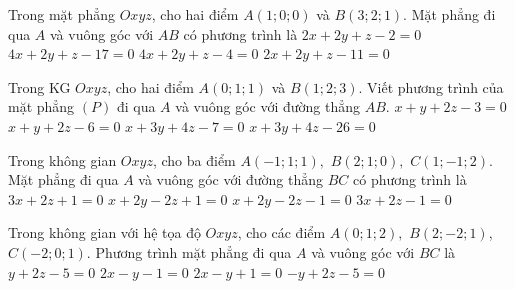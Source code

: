 \begin{ex}%
	Trong mặt phẳng $O x y z$, cho hai điểm $A(1 ; 0 ; 0)$ và $B(3 ; 2 ; 1)$. Mặt phẳng đi qua $A$ và vuông góc với $A B$ có phương trình là
	\choice
	{\True $2 x+2 y+z-2=0$}
	{$4 x+2 y+z-17=0$}
	{$4 x+2 y+z-4=0$}
	{$2 x+2 y+z-11=0$}
\end{ex}
\begin{ex}%
	Trong KG $Oxyz$, cho hai điểm $A(0 ; 1 ; 1)$  và $B(1 ; 2 ; 3)$. Viết phương trình của mặt phẳng $(P)$ đi qua $A$ và vuông góc với đường thẳng $A B$.
	\choice
	{\True $x+y+2 z-3=0$}
	{$x+y+2z-6=0$}
	{$x+3y+4z-7=0$}
	{$x+3y+4z-26=0$}
\end{ex}

\begin{ex}%
	Trong không gian $O x y z$, cho ba điểm $A(-1 ; 1 ; 1),$ $ B(2 ; 1 ; 0),$ $ C(1 ;-1 ; 2)$. Mặt phẳng đi qua $A$ và vuông góc với đường thẳng $B C$ có phương trình là
	\choice
	{$3 x+2 z+1=0$}
	{\True $x+2 y-2 z+1=0$}
	{$x+2 y-2 z-1=0$}
	{$3 x+2 z-1=0$}
\end{ex}
\begin{ex}%
	Trong không gian với hệ tọa độ $O x y z$, cho các điểm $A(0 ; 1 ; 2), $ $B(2 ;-2 ; 1)$, $C(-2 ; 0 ; 1)$. Phương trình mặt phẳng đi qua $A$ và vuông góc với $B C$ là
	\choice
	{$y+2 z-5=0$}
	{$2 x-y-1=0$}
	{\True $2 x-y+1=0$}
	{$-y+2 z-5=0$}
\end{ex}

